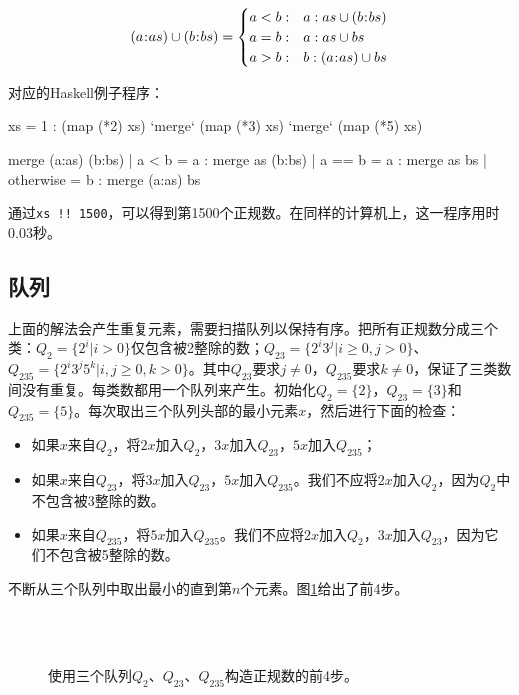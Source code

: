 \documentclass[b5paper]{ctexart}
\begin{document}
\[
(a \cons as) \cup (b \cons bs) = \begin{cases}
  a < b: & a : as \cup (b \cons bs) \\
  a = b: & a : as \cup bs \\
  a > b: & b : (a \cons as) \cup bs \\
\end{cases}
\]

对应的Haskell例子程序：
\begin{Haskell}
xs = 1 : (map (*2) xs) `merge` (map (*3) xs) `merge` (map (*5) xs)

merge (a:as) (b:bs) | a < b = a : merge as (b:bs)
                    | a == b = a : merge as bs
                    | otherwise = b : merge (a:as) bs
\end{Haskell}

通过\texttt{xs !! 1500}，可以得到第1500个正规数。在同样的计算机上，这一程序用时0.03秒。

\subsection*{队列}
上面的解法会产生重复元素，需要扫描队列以保持有序。把所有正规数分成三个类：$Q_2 = \{2^i | i > 0\}$仅包含被2整除的数；$Q_{23} = \{ 2^i3^j | i \geq 0, j > 0 \}$、$Q_{235} = \{ 2^i3^j5^k | i,j \geq 0, k > 0\}$。其中$Q_{23}$要求$j \neq 0$，$Q_{235}$要求$k \neq 0$，保证了三类数间没有重复。每类数都用一个队列来产生。初始化$Q_2=\{ 2 \}$，$Q_{23} = \{ 3 \}$和$Q_{235} = \{ 5 \}$。每次取出三个队列头部的最小元素$x$，然后进行下面的检查：

\begin{itemize}
\item 如果$x$来自$Q_2$，将$2x$加入$Q_2$，$3x$加入$Q_{23}$，$5x$加入$Q_{235}$；
\item 如果$x$来自$Q_{23}$，将$3x$加入$Q_{23}$，$5x$加入$Q_{235}$。我们不应将$2x$加入$Q_2$，因为$Q_2$中不包含被3整除的数。
\item 如果$x$来自$Q_{235}$，将$5x$加入$Q_{235}$。我们不应将$2x$加入$Q_2$，$3x$加入$Q_{23}$，因为它们不包含被5整除的数。
\end{itemize}

不断从三个队列中取出最小的直到第$n$个元素。图\ref{fig:q235}给出了前4步。

\begin{figure}[htbp]
  \centering
   \\
   \\
  \caption{使用三个队列$Q_2$、$Q_{23}$、$Q_{235}$构造正规数的前4步。}
  \label{fig:q235}
\end{figure}
\end{document}
